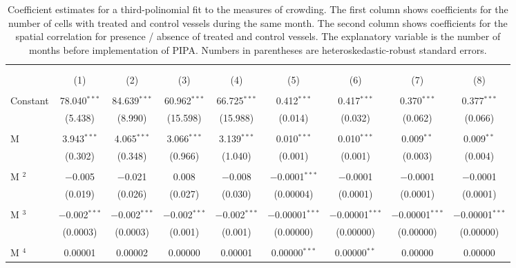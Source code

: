 
\begin{table}[!htbp] \centering 
  \caption{\label{tab:sp_corr}Coefficient estimates for a third-polinomial fit to the measures of crowding. The first column shows coefficients for the number of cells with treated and control vessels during the same month. The second column shows coefficients for the spatial correlation for presence / absence of treated and control vessels. The explanatory variable is the number of months before implementation of PIPA. Numbers in parentheses are heteroskedastic-robust standard errors.} 
  \label{} 
\footnotesize 
\begin{tabular}{@{\extracolsep{1pt}}lcccccccc} 
\\[-1.8ex]\hline 
\hline \\[-1.8ex] 
\\[-1.8ex] & (1) & (2) & (3) & (4) & (5) & (6) & (7) & (8)\\ 
\hline \\[-1.8ex] 
 Constant & 78.040$^{***}$ & 84.639$^{***}$ & 60.962$^{***}$ & 66.725$^{***}$ & 0.412$^{***}$ & 0.417$^{***}$ & 0.370$^{***}$ & 0.377$^{***}$ \\ 
  & (5.438) & (8.990) & (15.598) & (15.988) & (0.014) & (0.032) & (0.062) & (0.066) \\ 
  & & & & & & & & \\ 
 M & 3.943$^{***}$ & 4.065$^{***}$ & 3.066$^{***}$ & 3.139$^{***}$ & 0.010$^{***}$ & 0.010$^{***}$ & 0.009$^{**}$ & 0.009$^{**}$ \\ 
  & (0.302) & (0.348) & (0.966) & (1.040) & (0.001) & (0.001) & (0.003) & (0.004) \\ 
  & & & & & & & & \\ 
 M $^2$ & $-$0.005 & $-$0.021 & 0.008 & $-$0.008 & $-$0.0001$^{***}$ & $-$0.0001 & $-$0.0001 & $-$0.0001 \\ 
  & (0.019) & (0.026) & (0.027) & (0.030) & (0.00004) & (0.0001) & (0.0001) & (0.0001) \\ 
  & & & & & & & & \\ 
 M $^3$ & $-$0.002$^{***}$ & $-$0.002$^{***}$ & $-$0.002$^{***}$ & $-$0.002$^{***}$ & $-$0.00001$^{***}$ & $-$0.00001$^{***}$ & $-$0.00001$^{***}$ & $-$0.00001$^{***}$ \\ 
  & (0.0003) & (0.0003) & (0.001) & (0.001) & (0.00000) & (0.00000) & (0.00000) & (0.00000) \\ 
  & & & & & & & & \\ 
 M $^4$ & 0.00001 & 0.00002 & 0.00000 & 0.00001 & 0.00000$^{***}$ & 0.00000$^{**}$ & 0.00000 & 0.00000 \\ 

\end{tabular}
\end{table}
